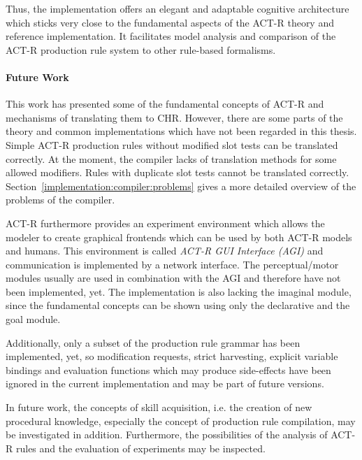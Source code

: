 Thus, the implementation offers an elegant and adaptable cognitive architecture which sticks very close to the fundamental aspects of the ACT-R theory and reference implementation. It facilitates model analysis and comparison of the ACT-R production rule system to other rule-based formalisms.

\paragraph{Future Work}

This work has presented some of the fundamental concepts of ACT-R and mechanisms of translating them to CHR. However, there are some parts of the theory and common implementations which have not been regarded in this thesis. Simple ACT-R production rules without modified slot tests can be translated correctly. At the moment, the compiler lacks of translation methods for some allowed modifiers. Rules with duplicate slot tests cannot be translated correctly. Section~\ref{implementation:compiler:problems} gives a more detailed overview of the problems of the compiler.

ACT-R furthermore provides an experiment environment which allows the modeler to create graphical frontends which can be used by both ACT-R models and humans. This environment is called \emph{ACT-R GUI Interface (AGI)} \cite{agi_reference} and communication is implemented by a network interface. The perceptual/motor modules usually are used in combination with the AGI and therefore have not been implemented, yet. The implementation is also lacking the imaginal module, since the fundamental concepts can be shown using only the declarative and the goal module.

Additionally, only a subset of the production rule grammar has been implemented, yet, so modification requests, strict harvesting, explicit variable bindings and evaluation functions which may produce side-effects have been ignored in the current implementation and may be part of future versions.

In future work, the concepts of skill acquisition, i.e. the creation of new procedural knowledge, especially the concept of production rule compilation, may be investigated in addition. Furthermore, the possibilities of the analysis of ACT-R rules and the evaluation of experiments may be inspected.

